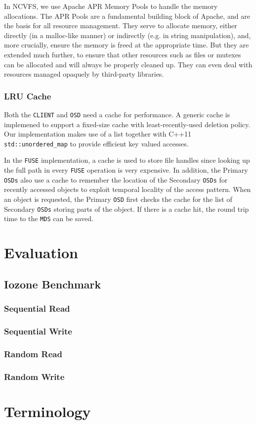 \documentclass{article}
\def\osd{\texttt{OSD} }
\def\osds{\texttt{OSDs} }
\def\mds{\texttt{MDS} }
\def\fuse{\texttt{FUSE} }
\def\client{\texttt{CLIENT} }
\begin{document}
In NCVFS, we use Apache APR Memory Pools to handle the memory allocations. 
The APR Pools are a fundamental building block of Apache, and are the basis for all resource management. 
They serve to allocate memory, either directly (in a malloc-like manner) or indirectly (e.g. in string manipulation), and, more crucially, 
ensure the memory is freed at the appropriate time. 
But they are extended much further, to ensure that other resources such as files or mutexes can be allocated and will always be properly cleaned up. 
They can even deal with resources managed opaquely by third-party libraries.

\subsubsection{LRU Cache}

Both the \client and \osd need a cache for performance. A generic cache is implemened to support 
a fixed-size cache with least-recently-used deletion policy. Our implementation makes use of a list
together with C++11 \texttt{std::unordered\_map} to provide efficient key valued accesses.

In the \fuse implementation, a cache is 
used to store file handles since looking up the full path in every \fuse operation is very expensive. In addition, the Primary \osds also use a cache to remember the location of the
Secondary \osds for recently accessed objects to exploit temporal locality of the access pattern.
When an object is requested, the Primary \osd first checks the cache for the list of Secondary 
\osds storing parts of the object. If there is a cache hit, the round trip time to the \mds can be
saved.

\section{Evaluation}

\subsection{Iozone Benchmark}

\subsubsection{Sequential Read}

\subsubsection{Sequential Write}

\subsubsection{Random Read}

\subsubsection{Random Write}

\section*{Terminology}

\newpage


\end{document}
